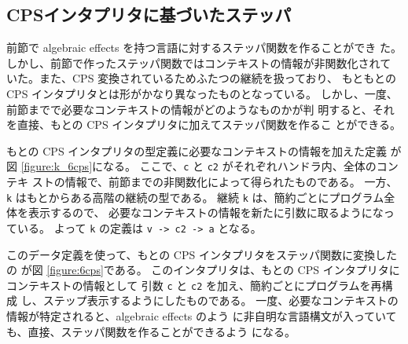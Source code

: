 \subsection{CPSインタプリタに基づいたステッパ}

前節で algebraic effects を持つ言語に対するステッパ関数を作ることができ
た。しかし、前節で作ったステッパ関数ではコンテキストの情報が非関数化されて
いた。また、CPS 変換されているためふたつの継続を扱っており、
もともとの CPS インタプリタとは形がかなり異なったものとなっている。
しかし、一度、前節までで必要なコンテキストの情報がどのようなものかが判
明すると、それを直接、もとの CPS インタプリタに加えてステッパ関数を作るこ
とができる。

もとの CPS インタプリタの型定義に必要なコンテキストの情報を加えた定義
が図 \ref{figure:k_6cps}になる。
ここで、\texttt{c} と \texttt{c2} がそれぞれハンドラ内、全体のコンテキ
ストの情報で、前節までの非関数化によって得られたものである。
一方、\texttt{k} はもとからある高階の継続の型である。
継続 \texttt{k} は、簡約ごとにプログラム全体を表示するので、
必要なコンテキストの情報を新たに引数に取るようになっている。
よって \texttt{k} の定義は \texttt{v -> c2 -> a} となる。

このデータ定義を使って、もとの CPS インタプリタをステッパ関数に変換したの
が図 \ref{figure:6cps}である。
このインタプリタは、もとの CPS インタプリタにコンテキストの情報として
引数 \texttt{c} と \texttt{c2} を加え、簡約ごとにプログラムを再構成
し、ステップ表示するようにしたものである。
一度、必要なコンテキストの情報が特定されると、algebraic effects のよう
に非自明な言語構文が入っていても、直接、ステッパ関数を作ることができるよう
になる。

